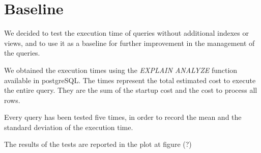 \section{Baseline}

We decided to test the execution time of queries without additional indexes or views, and to use it as a baseline for further improvement in the management of the queries.

We obtained the execution times using the \emph{EXPLAIN ANALYZE} function available in postgreSQL. The times represent the total estimated cost to execute the entire query. They are the sum of the startup cost and the cost to process all rows.

Every query has been tested five times, in order to record the mean and the standard deviation of the execution time. 

The results of the tests are reported in the plot at figure (?)